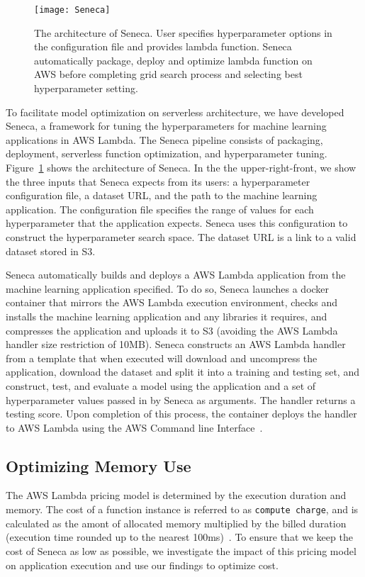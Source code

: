 \begin{figure}[t] \centering 
\texttt{[image: Seneca]}
\caption{The architecture of Seneca. 
User specifies hyperparameter options in the configuration file and provides lambda function. Seneca automatically package, deploy and optimize lambda function on AWS before completing grid search process and selecting best hyperparameter setting.
\label{fig:seneca}}
\end{figure}

To facilitate model optimization on serverless architecture, we have developed Seneca, 
a framework for tuning the hyperparameters for machine learning applications 
in AWS Lambda. 
The Seneca pipeline consists of packaging, deployment, serverless 
function optimization, and hyperparameter tuning. Figure~\ref{fig:seneca} 
shows the architecture of Seneca.  In the the upper-right-front, we
show the three inputs that Seneca expects from its users: a hyperparameter
configuration file, a dataset URL, and the path to 
the machine learning application.
The configuration file
specifies the range of values for each hyperparameter that the 
application expects.  Seneca uses this configuration to construct
the hyperparameter search space.  The dataset URL is a link to a
valid dataset stored in S3.  

Seneca automatically builds and deploys a AWS Lambda application
from the machine learning application specified.
To do so, Seneca launches a docker container that mirrors the
AWS Lambda execution environment, checks and installs
the machine learning application and any libraries it requires,
and compresses the application and uploads it to S3 (avoiding
the AWS Lambda handler size restriction of 10MB).
Seneca constructs an AWS Lambda handler from a template
that when executed will download and uncompress the application,
download the dataset and split it into a training and testing set,
and construct, test, and evaluate a model using the application
and a set of hyperparameter values passed in by Seneca as arguments.
The handler returns a testing score.
Upon completion of this process, the container deploys the handler
to AWS Lambda using the
AWS Command line Interface~\cite{ref:awscli}.


\subsection{Optimizing Memory Use}

The AWS Lambda pricing model is determined by the execution duration 
and memory. The cost of a function instance is referred to as 
\texttt{compute charge}, and is calculated as the amont of 
allocated memory multiplied by the
billed duration (execution time rounded up to the 
nearest 100ms)~\cite{awspricing}.
To ensure that we keep the cost of Seneca as low as possible, we investigate
the impact of this pricing model on application execution and use
our findings to optimize cost.

